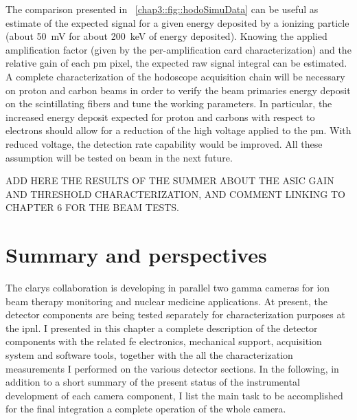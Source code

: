 The comparison presented in \figurename~\ref{chap3::fig::hodoSimuData} can be useful as estimate of the expected signal for a given energy deposited by a ionizing particle (about 50~mV for about 200~keV of energy deposited). Knowing the applied amplification factor (given by the per-amplification card characterization) and the relative gain of each \gls{pm} pixel, the expected raw signal integral can be estimated.\\
A complete characterization of the hodoscope acquisition chain will be necessary on proton and carbon beams in order to verify the beam primaries energy deposit on the scintillating fibers and tune the working parameters. In particular, the increased energy deposit expected for proton and carbons with respect to electrons should allow for a reduction of the high voltage applied to the \gls{pm}. With reduced voltage, the detection rate capability would be improved. All these assumption will be tested on beam in the next future.

ADD HERE THE RESULTS OF THE SUMMER ABOUT THE ASIC GAIN AND THRESHOLD CHARACTERIZATION, AND COMMENT LINKING TO CHAPTER 6 FOR THE BEAM TESTS. 

\newpage


\section{Summary and perspectives}\label{chap3::sec::Next}

The \gls{clarys} collaboration is developing in parallel two gamma cameras for ion beam therapy monitoring and nuclear medicine applications. At present, the detector components are being tested separately for characterization purposes at the \gls{ipnl}. I presented in this chapter a complete description of the detector components with the related \gls{fe} electronics, mechanical support, acquisition system and software tools, together with the all the characterization measurements I performed on the various detector sections. In the following, in addition to a short summary of the present status of the instrumental development of each camera component, I list the main task to be accomplished for the final integration a complete operation of the whole camera. 

